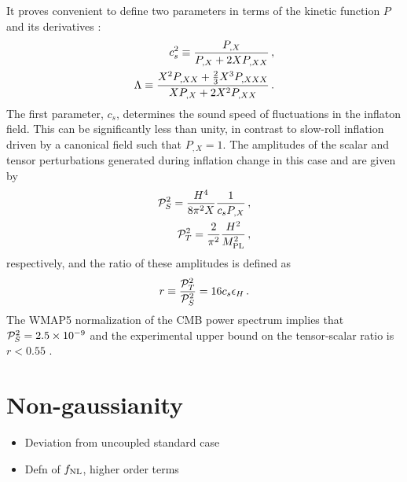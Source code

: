 It proves convenient to define two parameters in terms of the 
kinetic  function $P$ and its derivatives \cite{lidser1,lidser3}: 
% 
\begin{eqnarray}
\label{eq:defcs-dbiintro}
 c_s^2 \equiv \frac{P_{,X}}{P_{,X} + 2X P_{,XX}} \,,
\\
\label{eq:deflambda-dbiintro}
\Lambda \equiv  \frac{X^2 P_{,XX} +
\frac{2}{3}X^3 P_{,XXX}}{X P_{,X} +
2X^2 P_{,XX}}\,.
\end{eqnarray}
% 
The first parameter, $c_s$, determines the sound speed of fluctuations 
in the inflaton field. This can be significantly less than unity, 
in contrast to slow-roll inflation driven by a canonical 
field such that $P_{,X} =1$.
The amplitudes of the scalar and tensor perturbations 
generated during inflation change in this case and are given by \cite{gm}
% 
\begin{eqnarray} 
\label{eq:Ps-dbiintro}
 \mathcal{P}_S^2 = \frac{H^4}{8\pi^2 X}\frac{1}{c_s P_{,X}} \,,
\\
\label{eq:Pt-dbiintro}
\mathcal{P}_T^2 = \frac{2}{\pi^2} \frac{H^2}{M_{\mathrm{PL}}^2} \,,
\end{eqnarray}
% 
respectively, and the ratio of these amplitudes 
is defined as \cite{gm} 
% 
\begin{equation}
\label{eq:rdefn-dbiintro}
r\equiv \frac{\mathcal{P}_T^2}{\mathcal{P}_S^2} = 16c_s \epsilon_H \,.
\end{equation}
%   
The WMAP5 normalization of the CMB power spectrum 
implies that $\mathcal{P}_S^2= 2.5\times10^{-9}$ and 
the experimental upper bound on the tensor-scalar 
ratio is $r <0.55$ \cite{Komatsu:2008hk}.




\section{Non-gaussianity}
\label{sec:fnl-intro}
\begin{itemize}
 \item Deviation from uncoupled standard case
 \item Defn of $f_{\mathrm{NL}}$, higher order terms
\end{itemize}


